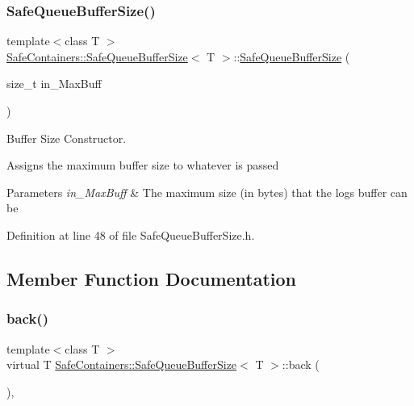 \subsubsection{\texorpdfstring{SafeQueueBufferSize()}{SafeQueueBufferSize()}\hspace{0.1cm}{\footnotesize\ttfamily [2/2]}}
{\footnotesize\ttfamily template$<$class T $>$ \\
\mbox{\hyperlink{classSafeContainers_1_1SafeQueueBufferSize}{Safe\+Containers\+::\+Safe\+Queue\+Buffer\+Size}}$<$ T $>$\+::\mbox{\hyperlink{classSafeContainers_1_1SafeQueueBufferSize}{Safe\+Queue\+Buffer\+Size}} (\begin{DoxyParamCaption}\item[{size\+\_\+t}]{in\+\_\+\+Max\+Buff }\end{DoxyParamCaption})\hspace{0.3cm}{\ttfamily [inline]}}



Buffer Size Constructor. 

Assigns the maximum buffer size to whatever is passed


\begin{DoxyParams}{Parameters}
{\em in\+\_\+\+Max\+Buff} & The maximum size (in bytes) that the logs buffer can be \\
\hline
\end{DoxyParams}


Definition at line 48 of file Safe\+Queue\+Buffer\+Size.\+h.



\subsection{Member Function Documentation}
\mbox{\label{classSafeContainers_1_1SafeQueueBufferSize_a4b4b10ec7856724be38501fbfb6f9394}} 
\subsubsection{\texorpdfstring{back()}{back()}}
{\footnotesize\ttfamily template$<$class T $>$ \\
virtual T \mbox{\hyperlink{classSafeContainers_1_1SafeQueueBufferSize}{Safe\+Containers\+::\+Safe\+Queue\+Buffer\+Size}}$<$ T $>$\+::back (\begin{DoxyParamCaption}{ }\end{DoxyParamCaption})\hspace{0.3cm}{\ttfamily [inline]}, {\ttfamily [virtual]}}



